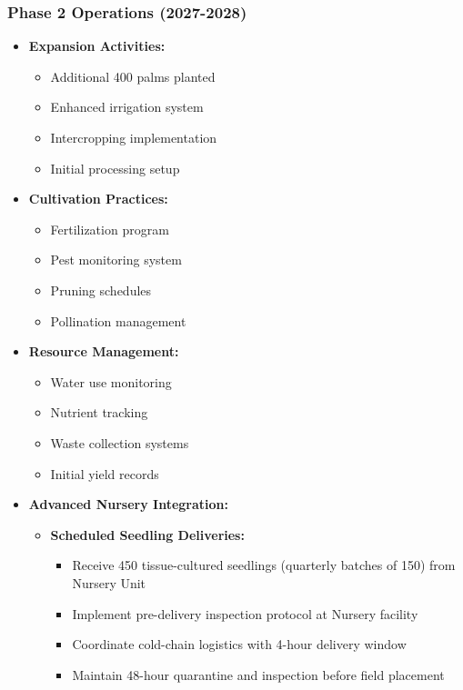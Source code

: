 \subsubsection{Phase 2 Operations (2027-2028)}
\begin{itemize}
    \item \textbf{Expansion Activities:}
    \begin{itemize}
        \item Additional 400 palms planted
        \item Enhanced irrigation system
        \item Intercropping implementation
        \item Initial processing setup
    \end{itemize}
    \item \textbf{Cultivation Practices:}
    \begin{itemize}
        \item Fertilization program
        \item Pest monitoring system
        \item Pruning schedules
        \item Pollination management
    \end{itemize}
    \item \textbf{Resource Management:}
    \begin{itemize}
        \item Water use monitoring
        \item Nutrient tracking
        \item Waste collection systems
        \item Initial yield records
    \end{itemize}
    \item \textbf{Advanced Nursery Integration:}
    \begin{itemize}
        \item \textbf{Scheduled Seedling Deliveries:}
        \begin{itemize}
            \item Receive 450 tissue-cultured seedlings (quarterly batches of 150) from Nursery Unit
            \item Implement pre-delivery inspection protocol at Nursery facility
            \item Coordinate cold-chain logistics with 4-hour delivery window
            \item Maintain 48-hour quarantine and inspection before field placement

\end{itemize}
\end{itemize}
\end{itemize}
